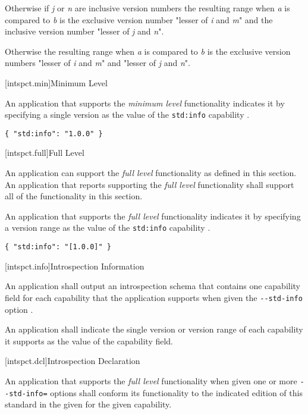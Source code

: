 \pnum
Otherwise if \emph{j} or \emph{n} are inclusive version numbers the resulting
range when \emph{a} is compared to \emph{b} is the exclusive version number
"lesser of \emph{i} and \emph{m}" and the inclusive version number "lesser of
\emph{j} and \emph{n}".

\pnum
Otherwise the resulting range when \emph{a} is compared to \emph{b} is the
exclusive version numbers "lesser of \emph{i} and \emph{m}" and "lesser of
\emph{j} and \emph{n}".

[intspct.min]{Minimum Level}

\pnum
An application that supports the \emph{minimum level} functionality indicates
it by specifying a single version  as the value of the
\verb|std:info| capability .

\begin{example}
\verb|{ "std:info": "1.0.0" }|
\end{example}

[intspct.full]{Full Level}

\pnum
An application can support the \emph{full level} functionality as defined in
this section. An application that reports supporting the \emph{full level}
functionality shall support all of the functionality in this section.

\pnum
An application that supports the \emph{full level} functionality indicates it by
specifying a version range  as the value of the
\verb|std:info| capability  .

\begin{example}
\verb|{ "std:info": "[1.0.0]" }|
\end{example}
	
[intspct.info]{Introspection Information}

\pnum
An application shall output an introspection schema  that
contains one capability field for each capability that the application supports
when given the \verb|--std-info| option .

\pnum
An application shall indicate the single version  or
version range  of each capability it supports as the
value of the capability field.

[intspct.dcl]{Introspection Declaration}

\pnum
An application that supports the \emph{full level} functionality when given one
or more \verb|--std-info=| options shall conform its
functionality to the indicated edition of this standard in the given
  for the given capability.

